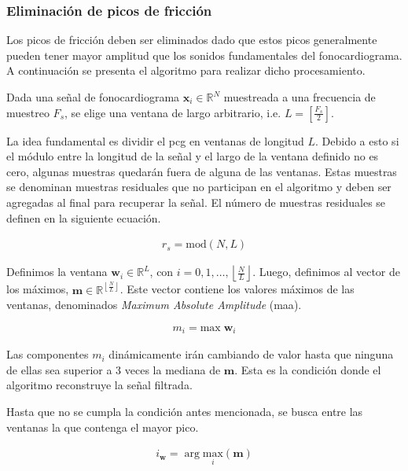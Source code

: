 \pagebreak

\subsubsection*{Eliminación de picos de fricción}

\indent Los picos de fricción deben ser eliminados dado que estos picos generalmente pueden tener mayor amplitud que los sonidos fundamentales del fonocardiograma. A continuación se presenta el algoritmo para realizar dicho procesamiento. \bigskip

\indent Dada una señal de fonocardiograma $\bm{x}_i \in \mathbb{R}^N$ muestreada a una frecuencia de muestreo $F_s$, se elige una ventana de largo arbitrario, i.e. $L = \left[\frac{F_s}{2}\right]$. \bigskip

\indent La idea fundamental es dividir el \acrshort{pcg} en ventanas de longitud $L$. Debido a esto si el módulo entre la longitud de la señal y el largo de la ventana definido no es cero, algunas muestras quedarán fuera de alguna de las ventanas. Estas muestras se denominan muestras residuales que no participan en el algoritmo y deben ser agregadas al final para recuperar la señal. El número de muestras residuales se definen en la siguiente ecuación. 

\begin{align}
    r_s = \mathrm{mod}(N,L)
\end{align}

\indent Definimos la ventana $\bm{w}_i \in \mathbb{R}^L$, con $i = 0,1,\dots,\left\lfloor \frac{N}{L} \right\rfloor$. Luego, definimos al vector de los máximos, $\bm{m} \in \mathbb{R}^{\left\lfloor \frac{N}{L} \right\rfloor}$. Este vector contiene los valores máximos de las ventanas, denominados \textit{Maximum Absolute Amplitude} (\acrshort{maa}).

\begin{align}
    m_i = \mathrm{max} \; \bm{w}_i 
\end{align}

\indent Las componentes $m_i$ dinámicamente irán cambiando de valor hasta que ninguna de ellas sea superior a 3 veces la mediana de $\bm{m}$. Esta es la condición donde el algoritmo reconstruye la señal filtrada. \bigskip

\indent Hasta que no se cumpla la condición antes mencionada, se busca entre las ventanas la que contenga el mayor pico. 

\begin{align}
    i_{\bm{w}} = \arg \underset{i}{\mathrm{max}} (\bm{m})
\end{align}

